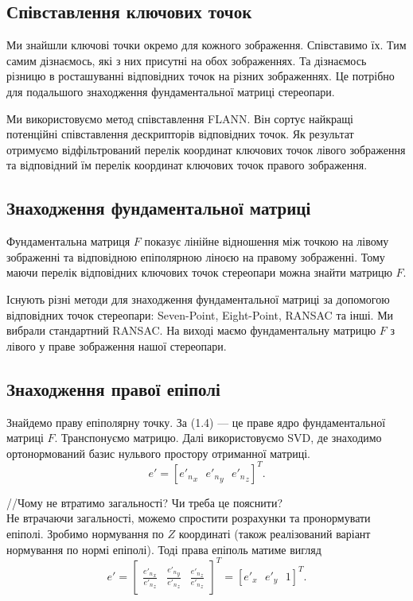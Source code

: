 \subsection{Співставлення ключових точок}
Ми знайшли ключові точки окремо для кожного зображення. Співставимо їх. Тим самим
дізнаємось, які з них присутні на обох зображеннях. Та дізнаємось різницю в 
росташуванні відповідних точок на різних зображеннях. Це потрібно для подальшого 
знаходження фундаментальної матриці стереопари.

Ми використовуємо метод співставлення FLANN\cite{Muja09fastapproximate}. Він 
сортує найкращі потенційні співставлення дескрипторів відповідних точок. Як
результат отримуємо відфільтрований перелік координат ключових точок лівого 
зображення та відповідний їм перелік координат ключових точок правого зображення.


\subsection{Знаходження фундаментальної матриці}
Фундаментальна матриця $F$ показує лінійне відношення між точкою на лівому 
зображенні та відповідною епіполярною ліноєю на правому зображенні. Тому маючи 
перелік відповідних ключових точок стереопари можна знайти матрицю $F$. 

Існують різні методи для знаходження фундаментальної матриці за допомогою 
відповідних точок стереопари: Seven-Point\cite{Hartley94projectivereconstruction},
Eight-Point\cite{LonguetHiggins1981ACA}, RANSAC\cite{10.1145/358669.358692} 
та інші. Ми вибрали стандартний RANSAC. На виході маємо фундаментальну матрицю
$F$ з лівого у праве зображення нашої стереопари.


\subsection{Знаходження правої епіполі}
Знайдемо праву епіполярну точку. За (1.4) --- це праве ядро фундаментальної 
матриці $F$. Транспонуємо матрицю. Далі використовуємо SVD\cite{1102314}, 
де знаходимо ортонормований базис нульвого простору отриманної матриці. 
\begin{equation}
e' = {[{{e'}_n}_x \:\:\: {{e'}_n}_y \:\:\: {{e'}_n}_z]}^T.
\end{equation}

//Чому не втратимо загальності? Чи треба це пояснити?\\
Не втрачаючи загальності, можемо спростити розрахунки та пронормувати епіполі.
Зробимо нормування по $Z$ координаті (також реалізований варіант нормування 
по нормі епіполі). Тоді права епіполь матиме вигляд
\begin{equation}
e' = {
\begin{bmatrix}
\frac{{{e'}_n}_x}{{{e'}_n}_z} & \frac{{{e'}_n}_y}{{{e'}_n}_z} & 
\frac{{{e'}_n}_z}{{{e'}_n}_z}
\end{bmatrix}
}^T = {[e'_x \:\:\: e'_y \:\:\: 1]}^T.
\end{equation}

